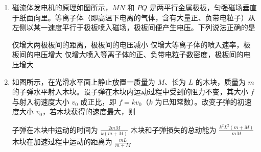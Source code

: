 \documentclass[\gkver]{gaokaozhenti}
\begin{document}
\begin{enumerate}
{故选 AC。
}

\item
磁流体发电机的原理如图所示，$ MN $ 和 $ PQ $ 是两平行金属极板，匀强磁场垂直于纸面向里。等离子体（即高温下电离的气体，含有大量正、负带电粒子）从左侧以某一速度平行于极板喷入磁场，极板间便产生电压。下列说法正确的是 

{仅增大两极板间的距离，极板间的电压减小}
{仅增大等离子体的喷入速率，极板间的电压增大}
{仅增大喷入等离子体的正、负带电粒子数密度，极板间的电压增大}


\item
如图所示，在光滑水平面上静止放置一质量为 $ M $、长为 $ L $ 的木块，质量为 $ m $ 的子弹水平射入木块。设子弹在木块内运动过程中受到的阻力不变，其大小 $ f $ 与射入初速度大小 $ v_{0} $ 成正比，即 $ f = kv_{0} $（$ k $ 为已知常数）。改变子弹的初速度大小 $ v_{0} $，若木块获得的速度最大，则 

{子弹在木块中运动的时间为 $ \frac{{2mM}}{{k(m + M)}} $}
{木块和子弹损失的总动能为 $ \frac{{{k^2}{L^2}(m + M)}}{{mM}} $}
{木块在加速过程中运动的距离为 $ \frac{{mL}}{{m + M}} $}

\end{enumerate}
\end{document}
